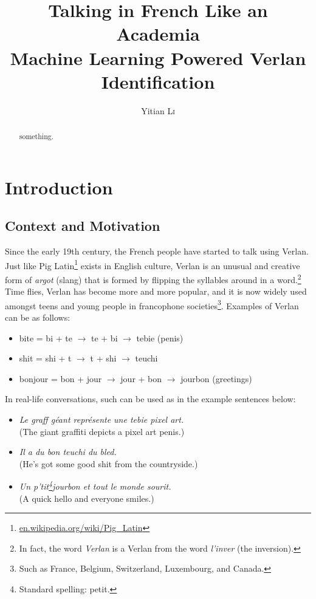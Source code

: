 \documentclass[12pt]{article}
\title{Talking in French Like an Academia\\\large Machine Learning Powered Verlan Identification}
\author{Yitian \textsc{Li}}
\begin{document}
\maketitle

\begin{abstract}
something.
\end{abstract}

\section{Introduction}
\subsection{Context and Motivation}

Since the early 19th century, the French people have started to talk using Verlan. Just like Pig Latin\footnote{\url{en.wikipedia.org/wiki/Pig_Latin}} exists in English culture, Verlan is an unusual and creative form of \textit{argot} (slang) that is formed by flipping the syllables around in a word.\footnote{In fact, the word \textit{Verlan} is a Verlan from the word \textit{l'inver} (the inversion).}\cite{rajabov2025,bach2018} 
Time flies, Verlan has become more and more popular, and it is now widely used amongst teens and young people in francophone societies\footnote{Such as France, Belgium, Switzerland, Luxembourg, and Canada.}\cite{evolutionVerlan}. Examples of Verlan can be as follows:

\begin{flushleft}
\small
\begin{itemize}
  \item bite = bi + te \(\rightarrow\) te + bi \(\rightarrow\) tebie (penis)
  \item shit = shi + t \(\rightarrow\) t + shi \(\rightarrow\) teuchi\cite{evolutionVerlan}
  \item bonjour = bon + jour \(\rightarrow\) jour + bon \(\rightarrow\) jourbon (greetings)
\end{itemize}
\end{flushleft}

\noindent In real-life conversations, such can be used as in the example sentences below:

\begin{flushleft}
\small
\begin{itemize}
  \item \textit{Le graff géant représente une tebie pixel art.}\\(The giant graffiti depicts a pixel art penis.)
  \item \textit{Il a du bon teuchi du bled.}\\(He's got some good shit from the countryside.)
  \item \textit{Un p'tit\footnote{Standard spelling: petit.}jourbon et tout le monde sourit.}\\(A quick hello and everyone smiles.)
\end{itemize}
\end{flushleft}
\end{document}
